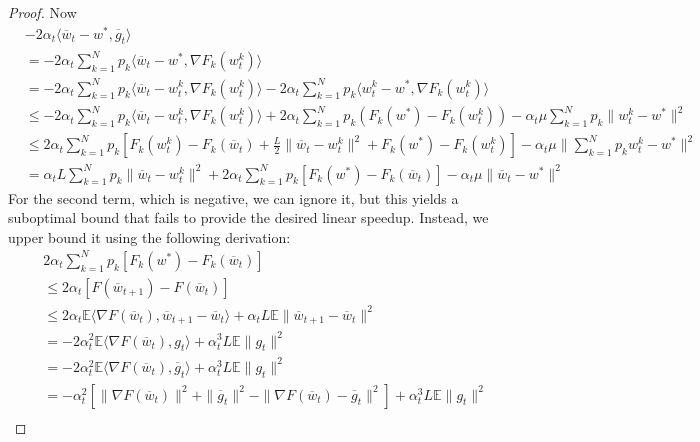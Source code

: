 \begin{proof}
	Now 
	\begin{align*}
	& -2\alpha_{t}\langle\overline{w}_{t}-w^{\ast},\overline{g}_{t}\rangle\\
	& =-2\alpha_{t}\sum_{k=1}^{N}p_{k}\langle\overline{w}_{t}-w^{\ast},\nabla F_{k}(w_{t}^{k})\rangle\\
	& =-2\alpha_{t}\sum_{k=1}^{N}p_{k}\langle\overline{w}_{t}-w_{t}^{k},\nabla F_{k}(w_{t}^{k})\rangle-2\alpha_{t}\sum_{k=1}^{N}p_{k}\langle w_{t}^{k}-w^{\ast},\nabla F_{k}(w_{t}^{k})\rangle\\
	& \leq-2\alpha_{t}\sum_{k=1}^{N}p_{k}\langle\overline{w}_{t}-w_{t}^{k},\nabla F_{k}(w_{t}^{k})\rangle+2\alpha_{t}\sum_{k=1}^{N}p_{k}(F_{k}(w^{\ast})-F_{k}(w_{t}^{k}))-\alpha_{t}\mu\sum_{k=1}^{N}p_{k}\|w_{t}^{k}-w^{\ast}\|^{2}\\
	& \leq2\alpha_{t}\sum_{k=1}^{N}p_{k}\left[F_{k}(w_{t}^{k})-F_{k}(\overline{w}_{t})+\frac{L}{2}\|\overline{w}_{t}-w_{t}^{k}\|^{2}+F_{k}(w^{\ast})-F_{k}(w_{t}^{k})\right]-\alpha_{t}\mu\|\sum_{k=1}^{N}p_{k}w_{t}^{k}-w^{\ast}\|^{2}\\
	& =\alpha_{t}L\sum_{k=1}^{N}p_{k}\|\overline{w}_{t}-w_{t}^{k}\|^{2}+2\alpha_{t}\sum_{k=1}^{N}p_{k}\left[F_{k}(w^{\ast})-F_{k}(\overline{w}_{t})\right]-\alpha_{t}\mu\|\overline{w}_{t}-w^{\ast}\|^{2}
	\end{align*}
	For the second term, which is negative, we can ignore it, but this
	yields a suboptimal bound that fails to provide the desired linear
	speedup. Instead, we upper bound it using the following derivation:
	\begin{align*}
	& 2\alpha_{t}\sum_{k=1}^{N}p_{k}\left[F_{k}(w^{\ast})-F_{k}(\overline{w}_{t})\right]\\
	& \leq2\alpha_{t}\left[F(\overline{w}_{t+1})-F(\overline{w}_{t})\right]\\
	& \leq2\alpha_{t}\mathbb{E}\langle\nabla F(\overline{w}_{t}),\overline{w}_{t+1}-\overline{w}_{t}\rangle+\alpha_{t}L\mathbb{E}\|\overline{w}_{t+1}-\overline{w}_{t}\|^{2}\\
	& =-2\alpha_{t}^{2}\mathbb{E}\langle\nabla F(\overline{w}_{t}),g_{t}\rangle+\alpha_{t}^{3}L\mathbb{E}\|g_{t}\|^{2}\\
	& =-2\alpha_{t}^{2}\mathbb{E}\langle\nabla F(\overline{w}_{t}),\overline{g}_{t}\rangle+\alpha_{t}^{3}L\mathbb{E}\|g_{t}\|^{2}\\
	& =-\alpha_{t}^{2}\left[\|\nabla F(\overline{w}_{t})\|^{2}+\|\overline{g}_{t}\|^{2}-\|\nabla F(\overline{w}_{t})-\overline{g}_{t}\|^{2}\right]+\alpha_{t}^{3}L\mathbb{E}\|g_{t}\|^{2}\\

\end{align*}
\end{proof}
